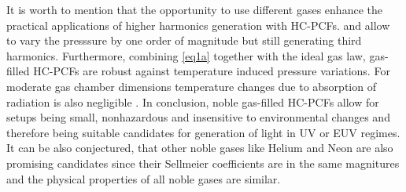 \documentclass[fleqn, 10pt, twocolumn]{SelfArx}
\begin{document}
    It is worth to mention that the opportunity to use different gases enhance the practical applications of higher harmonics generation with HC-PCFs. 
     and  allow to vary the presssure by one order of magnitude but still generating third harmonics. 
    Furthermore, combining \eqref{eq1a} together with the ideal gas law, gas-filled HC-PCFs are robust against temperature induced pressure variations. For moderate gas chamber dimensions temperature changes due to absorption of radiation is also negligible \cite{Serebryannikov2004}.
    In conclusion, noble gas-filled HC-PCFs allow for setups being small, nonhazardous and insensitive to environmental changes and therefore being 
    suitable candidates for generation of light in UV or EUV regimes.
    It can be also conjectured, that other noble gases like Helium and Neon are also promising candidates since their Sellmeier coefficients are in the same magnitures and the physical properties of all noble gases are similar. 

    \printbibliography
\end{document}
